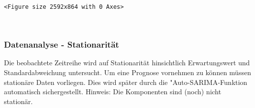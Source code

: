 \documentclass[paper=landscape]{scrartcl}
\begin{document}
    
    \begin{verbatim}
<Figure size 2592x864 with 0 Axes>
    \end{verbatim}

    
    \begin{center}
    \end{center}
    { \hspace*{\fill} \\}
    
    \hypertarget{datenanalyse---stationarituxe4t}{%
\subsubsection{Datenanalyse -
Stationarität}\label{datenanalyse---stationarituxe4t}}

Die beobachtete Zeitreihe wird auf Stationarität hinsichtlich
Erwartungswert und Standardabweichung untersucht. Um eine Prognose
vornehmen zu können müssen stationäre Daten vorliegen. Dies wird später
durch die "Auto-SARIMA-Funktion automatisch sichergestellt. Hinweis: Die
Komponenten sind (noch) nicht stationär.
\end{document}
